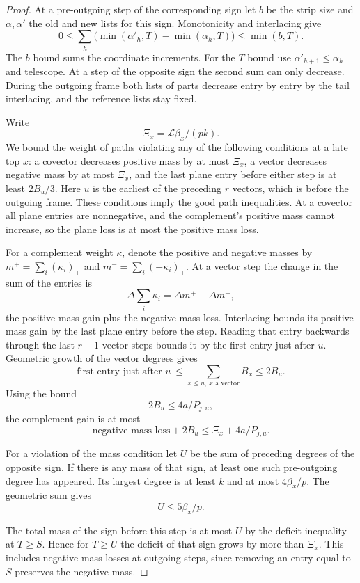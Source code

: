 \begin{proof}
At a pre-outgoing step of the corresponding sign let
\(b\) be the strip size and \(\alpha,\alpha'\) the old and
new lists for this sign. Monotonicity and interlacing give
\[
 0\le\sum_h\bigl(\min(\alpha'_h,T)-\min(\alpha_h,T)\bigr)
           \le \min(b,T).
\]
The \(b\) bound sums the coordinate increments. For the
\(T\) bound use \(\alpha'_{h+1}\le\alpha_h\) and telescope. At a step of the opposite sign the
second sum can only decrease. During the outgoing frame both
lists of parts decrease entry by entry by the tail interlacing,
and the reference lists stay fixed.

Write
\[
 \Xi_x=\mathcal L\beta_x/(pk).
\]
We bound the weight of
paths violating any of the following conditions at a late top
\(x\): a covector decreases positive mass by at most \(\Xi_x\),
a vector decreases negative mass by at most \(\Xi_x\), and the
last plane entry before either step is at least \(2B_u/3\).
Here \(u\) is the earliest of the preceding \(r\) vectors, which
is before the outgoing frame. These conditions imply the good
path inequalities. At a covector all plane entries are
nonnegative, and the complement's positive mass cannot
increase, so the plane loss is at most the positive mass loss.

For a complement weight \(\kappa\), denote the positive and negative masses by \(m^+=\sum_i(\kappa_i)_+\) and \(m^-=\sum_i(-\kappa_i)_+\). At a vector step the change in the sum of the entries is 
\[
 \Delta\!\sum_i\kappa_i=\Delta m^+-\Delta m^-,
\]
 the positive mass gain plus the negative mass loss. Interlacing bounds its
positive mass gain by the last plane entry before the step.
Reading that entry backwards through the last \(r-1\) vector
steps bounds it by the first entry just after \(u\). Geometric growth of the vector degrees gives
\[
 \text{first entry just after }u\ \le\!\sum_{x\le u,\ x\text{ a vector}} B_x\le 2B_u.
\]
Using the bound
\[
 2B_u\le4a/P_{j,u},
\]
the complement
gain is at most
\[
       \text{negative mass loss}+2B_u
                      \le \Xi_x+4a/P_{j,u}.
\]

For a violation of the mass condition let \(U\) be the sum
of preceding degrees of the opposite sign. If there is any
mass of that sign, at least one such pre-outgoing degree has
appeared. Its largest degree is at least \(k\) and at most
\(4\beta_x/p\). The geometric sum gives
\[
 U\le5\beta_x/p.
\]

The total mass of the sign before this step is at most \(U\)
by the deficit inequality at \(T\ge S\). Hence for \(T\ge U\)
the deficit of that sign grows by more than \(\Xi_x\). This
includes negative mass losses at outgoing steps, since removing
an entry equal to \(S\) preserves the negative mass.


\end{proof}
